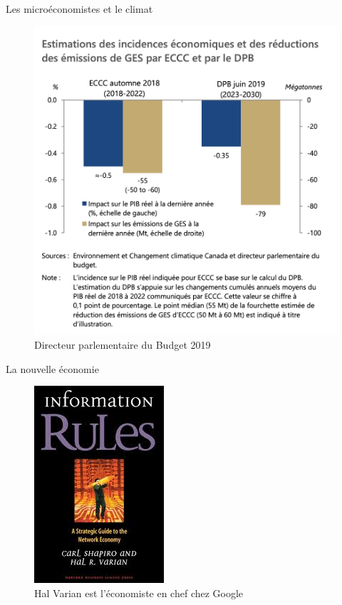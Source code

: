 \documentclass[handout]{beamer}
\begin{document}
\begin{frame}{Les microéconomistes et le climat}

\begin{figure}
	\includegraphics[scale=0.35]{climat.png}
	\caption{Directeur parlementaire du Budget 2019}
\end{figure}

\end{frame}


\begin{frame}{La nouvelle économie}

\begin{figure}
	\includegraphics[scale=0.5]{rules.jpeg}
	\caption{Hal Varian est l'économiste en chef chez Google}
\end{figure}

\end{frame}
\end{document}
